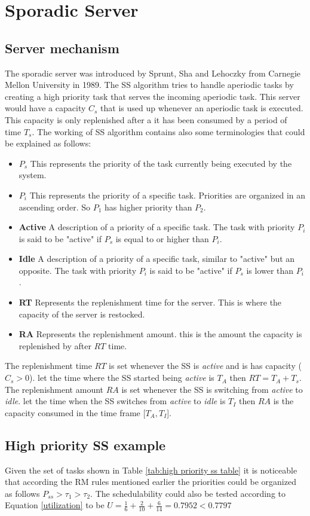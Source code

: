 \documentclass[conference]{IEEEtran}
\begin{document}
\section{Sporadic Server}
\subsection{Server mechanism}
The sporadic server was introduced by Sprunt, Sha and Lehoczky from Carnegie Mellon University in 1989. The SS algorithm tries to handle aperiodic tasks by creating a high priority task that serves the  incoming aperiodic task. This server would have a capacity ${C_s}$ that is used up whenever an aperiodic task is executed. This capacity is only replenished after a it has been consumed by a period of time $T_s$. The working of SS algorithm contains also some terminologies\cite{SpruntoSS} that could be explained as follows:
\begin{itemize}
    \item \textbf{$P_s$} This represents the priority of the task currently being executed by the system.
    \item \textbf{$P_i$} This represents the priority of a specific task. Priorities are organized in an ascending order. So $P_1$ has higher priority than $P_2$.
    \item \textbf{Active} A description of a priority of a specific task. The task with priority $P_i$ is said to be "active" if $P_s$ is equal to or higher than $P_i$.
    \item \textbf{Idle} A description of a priority of a specific task, similar to "active" but an opposite. The task with priority $P_i$ is said to be "active" if $P_s$ is lower than $P_i$.
    \item \textbf{RT} Represents the replenishment time for the server. This is where the capacity of the server is restocked.
    \item \textbf{RA} Represents the replenishment amount. this is the amount the capacity is replenished by after $RT$ time.
\end{itemize}
The replenishment time $RT$ is set whenever the SS is \textit{active} and is has capacity ($C_s>0$). let the time where the SS started being \textit{active} is $T_A$ then $RT = T_A + T_s$.
The replenishment amount $RA$ is set whenever the SS is switching from \textit{active} to \textit{idle}. let the time when the SS switches from \textit{active} to \textit{idle} is $T_I$ then $RA$ is the capacity consumed in the time frame [$T_A,T_I$].
\subsection{High priority SS example}
Given the set of tasks shown in Table \ref{tab:high priority ss table} it is noticeable that according the RM rules mentioned earlier the priorities could be organized as follows $P_{ss}> \tau_1>\tau_2$. The schedulability could also be tested according to Equation \ref{utilization} to be $U=\frac{1}{6}+\frac{2}{10}+\frac{6}{14}=0.7952 < 0.7797$ 
\end{document}
